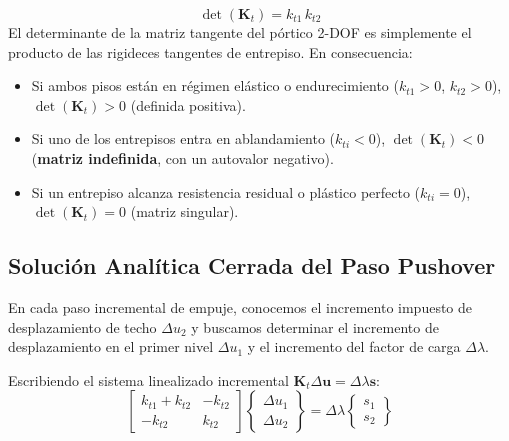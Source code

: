 \documentclass[11pt,letterpaper]{article}
\begin{document}
\begin{conceptbox}
\begin{equation}
    \label{eq:det_kt}
    \det(\mathbf{K}_t) = k_{t1} \, k_{t2}
\end{equation}
El determinante de la matriz tangente del pórtico 2-DOF es simplemente el producto de las rigideces tangentes de entrepiso. En consecuencia:
\begin{itemize}
    \item Si ambos pisos están en régimen elástico o endurecimiento ($k_{t1} > 0$, $k_{t2} > 0$), $\det(\mathbf{K}_t) > 0$ (definida positiva).
    \item Si uno de los entrepisos entra en ablandamiento ($k_{ti} < 0$), $\det(\mathbf{K}_t) < 0$ (\textbf{matriz indefinida}, con un autovalor negativo).
    \item Si un entrepiso alcanza resistencia residual o plástico perfecto ($k_{ti} = 0$), $\det(\mathbf{K}_t) = 0$ (matriz singular).
\end{itemize}
\end{conceptbox}

\subsection{Solución Analítica Cerrada del Paso Pushover}

En cada paso incremental de empuje, conocemos el incremento impuesto de desplazamiento de techo $\Delta u_2$ y buscamos determinar el incremento de desplazamiento en el primer nivel $\Delta u_1$ y el incremento del factor de carga $\Delta \lambda$. 

Escribiendo el sistema linealizado incremental $\mathbf{K}_t \Delta \mathbf{u} = \Delta \lambda \mathbf{s}$:
\begin{equation}
    \label{eq:sistema_incremental_2x2}
    \begin{bmatrix}
        k_{t1} + k_{t2} & -k_{t2} \\
        -k_{t2} & k_{t2}
    \end{bmatrix}
    \begin{Bmatrix}
        \Delta u_1 \\
        \Delta u_2
    \end{Bmatrix}
    =
    \Delta \lambda
    \begin{Bmatrix}
        s_1 \\
        s_2
    \end{Bmatrix}
\end{equation}
\end{document}
